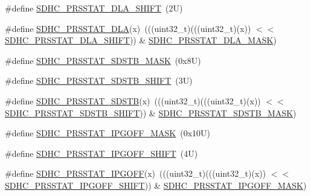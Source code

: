 \begin{DoxyCompactItemize}
\#define \mbox{\hyperlink{group___s_d_h_c___register___masks_gaad30094ca6309410952688acf6ed5f07}{S\+D\+H\+C\+\_\+\+P\+R\+S\+S\+T\+A\+T\+\_\+\+D\+L\+A\+\_\+\+S\+H\+I\+FT}}~(2\+U)
\item 
\#define \mbox{\hyperlink{group___s_d_h_c___register___masks_ga2194843dbc5cfb0eac43928450ec44e5}{S\+D\+H\+C\+\_\+\+P\+R\+S\+S\+T\+A\+T\+\_\+\+D\+LA}}(x)~(((uint32\+\_\+t)(((uint32\+\_\+t)(x)) $<$$<$ \mbox{\hyperlink{group___s_d_h_c___register___masks_gaad30094ca6309410952688acf6ed5f07}{S\+D\+H\+C\+\_\+\+P\+R\+S\+S\+T\+A\+T\+\_\+\+D\+L\+A\+\_\+\+S\+H\+I\+FT}})) \& \mbox{\hyperlink{group___s_d_h_c___register___masks_ga609f9258fa078236470445ebfcd2e9ac}{S\+D\+H\+C\+\_\+\+P\+R\+S\+S\+T\+A\+T\+\_\+\+D\+L\+A\+\_\+\+M\+A\+SK}})
\item 
\#define \mbox{\hyperlink{group___s_d_h_c___register___masks_ga45ba66986bd9e2c6419e1a4358b6a05e}{S\+D\+H\+C\+\_\+\+P\+R\+S\+S\+T\+A\+T\+\_\+\+S\+D\+S\+T\+B\+\_\+\+M\+A\+SK}}~(0x8\+U)
\item 
\#define \mbox{\hyperlink{group___s_d_h_c___register___masks_ga4857c2040b9dc29336795fba391dd1ca}{S\+D\+H\+C\+\_\+\+P\+R\+S\+S\+T\+A\+T\+\_\+\+S\+D\+S\+T\+B\+\_\+\+S\+H\+I\+FT}}~(3\+U)
\item 
\#define \mbox{\hyperlink{group___s_d_h_c___register___masks_ga4ac492603453c55023ec31b40e601d7a}{S\+D\+H\+C\+\_\+\+P\+R\+S\+S\+T\+A\+T\+\_\+\+S\+D\+S\+TB}}(x)~(((uint32\+\_\+t)(((uint32\+\_\+t)(x)) $<$$<$ \mbox{\hyperlink{group___s_d_h_c___register___masks_ga4857c2040b9dc29336795fba391dd1ca}{S\+D\+H\+C\+\_\+\+P\+R\+S\+S\+T\+A\+T\+\_\+\+S\+D\+S\+T\+B\+\_\+\+S\+H\+I\+FT}})) \& \mbox{\hyperlink{group___s_d_h_c___register___masks_ga45ba66986bd9e2c6419e1a4358b6a05e}{S\+D\+H\+C\+\_\+\+P\+R\+S\+S\+T\+A\+T\+\_\+\+S\+D\+S\+T\+B\+\_\+\+M\+A\+SK}})
\item 
\#define \mbox{\hyperlink{group___s_d_h_c___register___masks_ga60c111aa5a4259d9b556a30aa9cbf891}{S\+D\+H\+C\+\_\+\+P\+R\+S\+S\+T\+A\+T\+\_\+\+I\+P\+G\+O\+F\+F\+\_\+\+M\+A\+SK}}~(0x10\+U)
\item 
\#define \mbox{\hyperlink{group___s_d_h_c___register___masks_gab62b9ee7261708d8741ea70ecb103520}{S\+D\+H\+C\+\_\+\+P\+R\+S\+S\+T\+A\+T\+\_\+\+I\+P\+G\+O\+F\+F\+\_\+\+S\+H\+I\+FT}}~(4\+U)
\item 
\#define \mbox{\hyperlink{group___s_d_h_c___register___masks_ga485efa6dd3d9d07d8bdabd101feaf6f4}{S\+D\+H\+C\+\_\+\+P\+R\+S\+S\+T\+A\+T\+\_\+\+I\+P\+G\+O\+FF}}(x)~(((uint32\+\_\+t)(((uint32\+\_\+t)(x)) $<$$<$ \mbox{\hyperlink{group___s_d_h_c___register___masks_gab62b9ee7261708d8741ea70ecb103520}{S\+D\+H\+C\+\_\+\+P\+R\+S\+S\+T\+A\+T\+\_\+\+I\+P\+G\+O\+F\+F\+\_\+\+S\+H\+I\+FT}})) \& \mbox{\hyperlink{group___s_d_h_c___register___masks_ga60c111aa5a4259d9b556a30aa9cbf891}{S\+D\+H\+C\+\_\+\+P\+R\+S\+S\+T\+A\+T\+\_\+\+I\+P\+G\+O\+F\+F\+\_\+\+M\+A\+SK}})
$$
\end{DoxyCompactItemize}
